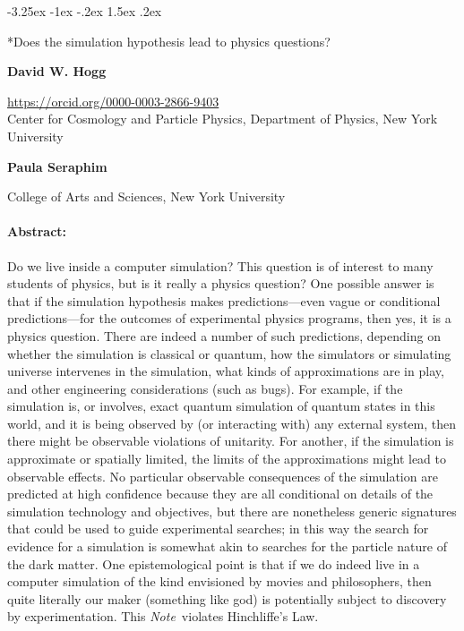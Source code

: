 \documentclass[letterpaper]{article}
\makeatletter
\renewcommand\section{\@startsection {section}{1}{\z@}%
  {-3.25ex \@plus -1ex \@minus -.2ex}%
  {1.5ex \@plus .2ex}%
  {\raggedright\normalfont\large\bfseries}}
\newcommand{\documentname}{\textsl{Note}}
\makeatother
\begin{document}
\section*{Does the simulation hypothesis lead to physics questions?}

\medskip\noindent
\textbf{David W. Hogg}
{\par\noindent\footnotesize%
\url{https://orcid.org/0000-0003-2866-9403}\\Center for Cosmology and Particle Physics, Department of Physics, New York University%
\par}

\medskip\noindent
\textbf{Paula Seraphim}
{\par\noindent\footnotesize%
College of Arts and Sciences, New York University%
\par}

\paragraph{Abstract:}
Do we live inside a computer simulation?
This question is of interest to many students of physics, but is it really a physics question?
One possible answer is that if the simulation hypothesis makes predictions---even vague or conditional predictions---for the outcomes of experimental physics programs, then yes, it is a physics question.
There are indeed a number of such predictions, depending on whether the simulation is classical or quantum, how the simulators or simulating universe intervenes in the simulation, what kinds of approximations are in play, and other engineering considerations (such as bugs).
For example, if the simulation is, or involves, exact quantum simulation of quantum states in this world, and it is being observed by (or interacting with) any external system, then there might be observable violations of unitarity.
For another, if the simulation is approximate or spatially limited, the limits of the approximations might lead to observable effects.
No particular observable consequences of the simulation are predicted at high confidence because they are all conditional on details of the simulation technology and objectives, but there are nonetheless generic signatures that could be used to guide experimental searches; in this way the search for evidence for a simulation is somewhat akin to searches for the particle nature of the dark matter.
One epistemological point is that if we do indeed live in a computer simulation of the kind envisioned by movies and philosophers, then quite literally our maker (something like god) is potentially subject to discovery by experimentation.
This \documentname\ violates Hinchliffe's Law.
\end{document}
